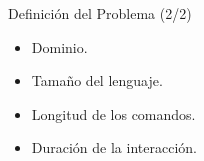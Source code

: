 \begin{frame}{Definici\'on del Problema (2/2)}

\begin{itemize}
    \vfill \item<+->{Dominio.}
    \vfill \item<+->{Tama\~no del lenguaje.}
    \vfill \item<+->{Longitud de los comandos.}
    \vfill \item<+->{Duraci\'on de la interacci\'on.}
\end{itemize}

\end{frame}